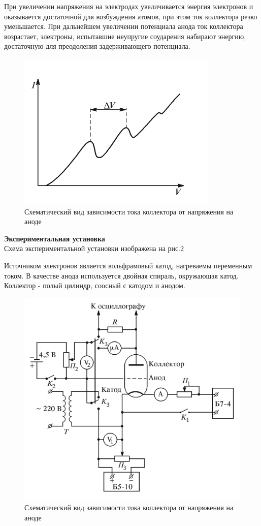 \documentclass[a4paper, 12pt]{article}%
\begin{document}
При увеличении напряжения на электродах увеличивается энергия электронов и оказывается достаточной для возбуждения атомов, при этом ток коллектора резко уменьшается. При дальнейшем увеличении потенциала анода ток коллектора возрастает, электроны, испытавшие неупругие соударения набирают энергию, достаточную для преодоления задерживающего потенциала.

\begin{figure}[H]
	\centering
	\includegraphics[width=0.6\linewidth]{1}
	\caption{Схематический вид зависимости тока коллектора от напряжения на аноде}
\end{figure}


\textbf{Экспериментальная установка}\\

Схема экспериментальной установки изображена на рис.2

Источником электронов является вольфрамовый катод, нагреваемы переменным током. В качестве анода используется двойная спираль, окружающая катод. Коллектор - полый цилиндр, соосный с катодом и анодом.  

\begin{figure}[H]
	\centering
	\includegraphics[width=0.6\linewidth]{ust}
	\caption{Схематический вид зависимости тока коллектора от напряжения на аноде}
\end{figure}




 
 
 
\end{document}
